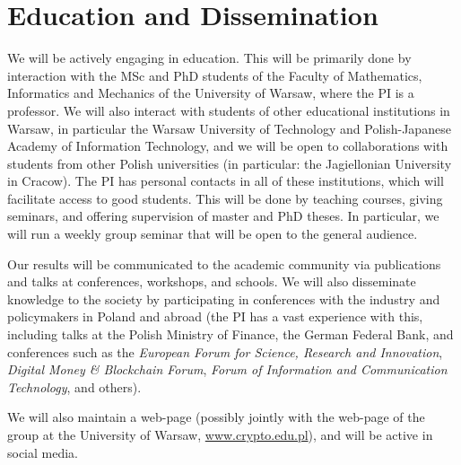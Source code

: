 \documentclass{article}
\begin{document}
\section{Education and Dissemination}

We will be actively engaging in education. This will be primarily done by interaction with the MSc and PhD students of the Faculty of Mathematics, Informatics and Mechanics of the University of Warsaw, where the PI is a professor. We will also interact with students of other educational institutions in Warsaw, in particular the Warsaw University of Technology and Polish-Japanese Academy of Information Technology, and we will be open to collaborations with students from other Polish universities (in particular: the Jagiellonian University in Cracow). The PI has personal contacts in all of these institutions, which will facilitate access to good students. This will be done by teaching courses, giving seminars, and offering supervision of master and PhD theses. In particular, we will run a weekly group seminar that will be open to the general audience.

Our results will be communicated to the academic community via publications and talks at conferences, workshops, and schools. We will also disseminate knowledge to the society by participating in conferences with the industry and policymakers in Poland and abroad (the PI has a vast experience with this, including talks at the Polish Ministry of Finance, the German Federal Bank, and conferences such as the \emph{European Forum for Science, Research and Innovation}, \emph{Digital Money \& Blockchain Forum}, \emph{Forum of Information and Communication Technology}, and others).

We will also maintain a web-page (possibly jointly with the web-page of the group at the University of Warsaw, \url{www.crypto.edu.pl}), and will be active in social media.




\printbibliography
\end{document}
